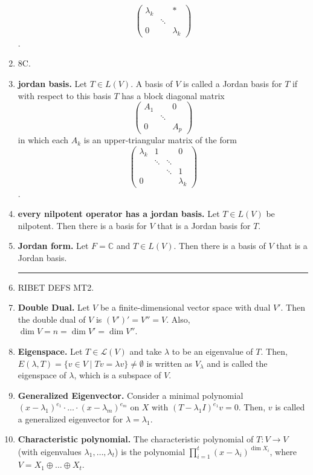 \begin{enumerate}
$$\begin{pmatrix}
	\lambda_k & & * \\
	 & \ddots &  \\
	0 & & \lambda_k
	\end{pmatrix}
	$$. 
	\item 8C. 
	\item \textbf{jordan basis. } Let $T \in L(V)$. A basis of $V$ is called a Jordan basis for $T$ if with respect to this basis $T$ has a block diagonal matrix 
	$$
	\begin{pmatrix}
	A_1 & & 0 \\
	 & \ddots & \\
	0 & & A_p
	\end{pmatrix}
	$$ in which each $A_k$ is an upper-triangular matrix of the form 
	$$
	\begin{pmatrix}
	\lambda_k & 1 & & 0 \\
	 & \ddots & \ddots & \\
	 & & \ddots & 1 \\
	0 & & & \lambda_k
	\end{pmatrix}
	$$. 
	\item \textbf{every nilpotent operator has a jordan basis. } Let $T \in L(V)$ be nilpotent. Then there is a basis for $V$ that is a Jordan basis for $T$. 
	\item \textbf{Jordan form. } Let $F = \mathbb{C}$ and $T \in L(V)$. Then there is a basis of $V$ that is a Jordan basis. 
	\begin{center}
		\hrule
	\end{center} 
	\item RIBET DEFS MT2.
	\item \textbf{Double Dual. } Let $V$ be a finite-dimensional vector space with dual $V'$. Then the double dual of $V$ is $(V')' = V'' = V$. Also, $\dim V = n = \dim V' = \dim V''$. 
	\item \textbf{Eigenspace. } Let $T \in \mathscr{L}(V)$ and take $\lambda$ to be an eigenvalue of $T$. Then, $E(\lambda,T) = \{v \in V \mid Tv = \lambda v\} \neq \emptyset$ is written as $V_\lambda$ and is called the eigenspace of $\lambda$, which is a subspace of $V$. 
	\item \textbf{Generalized Eigenvector. } Consider a minimal polynomial $(x-\lambda_1)^{e_1} \cdot \dots \cdot (x-\lambda_m)^{e_m}$ on $X$ with $(T-\lambda_1I)^{e_1}v = 0$. Then, $v$ is called a generalized eigenvector for $\lambda = \lambda_1$. 
	\item \textbf{Characteristic polynomial. } The characteristic polynomial of $T: V \to V$ (with eigenvalues $\lambda_1,\dots,\lambda_t$) is the polynomial $\prod_{i=1}^{t} (x-\lambda_i)^{\dim X_i}$, where $V = X_1 \oplus \dots \oplus X_t$. 

\end{enumerate}

